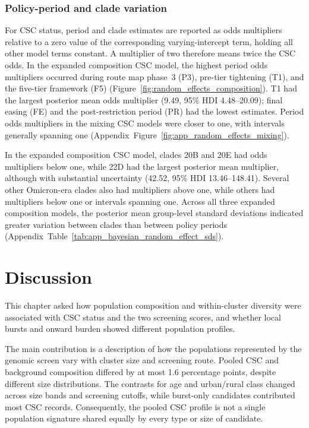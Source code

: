 \subsubsection*{Policy-period and clade variation}\label{sec:ch6_period_clade_results}

For CSC status, period and clade estimates are reported as odds multipliers relative to a zero value of the corresponding varying-intercept term, holding all other model terms constant. A multiplier of two therefore means twice the CSC odds. In the expanded composition CSC model, the highest period odds multipliers occurred during route map phase~3 (P3), pre-tier tightening (T1), and the five-tier framework (F5) (Figure~\ref{fig:random_effects_composition}). T1 had the largest posterior mean odds multiplier (9.49, 95\% HDI 4.48--20.09); final easing (FE) and the post-restriction period (PR) had the lowest estimates. Period odds multipliers in the mixing CSC models were closer to one, with intervals generally spanning one (Appendix~Figure~\ref{fig:app_random_effects_mixing}).

In the expanded composition CSC model, clades 20B and 20E had odds multipliers below one, while 22D had the largest posterior mean multiplier, although with substantial uncertainty (42.52, 95\% HDI 13.46--148.41). Several other Omicron-era clades also had multipliers above one, while others had multipliers below one or intervals spanning one. Across all three expanded composition models, the posterior mean group-level standard deviations indicated greater variation between clades than between policy periods (Appendix~Table~\ref{tab:app_bayesian_random_effect_sds}).

\section{Discussion}\label{sec:ch6_discussion}

This chapter asked how population composition and within-cluster diversity were associated with CSC status and the two screening scores, and whether local bursts and onward burden showed different population profiles.

The main contribution is a description of how the populations represented by the genomic screen vary with cluster size and screening route. Pooled CSC and background composition differed by at most 1.6 percentage points, despite different size distributions. The contrasts for age and urban/rural class changed across size bands and screening cutoffs, while burst-only candidates contributed most CSC records. Consequently, the pooled CSC profile is not a single population signature shared equally by every type or size of candidate.

